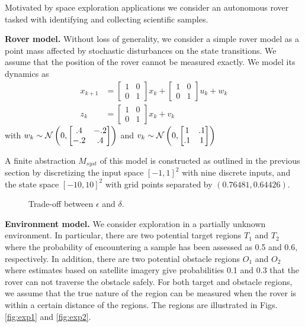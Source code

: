 
Motivated by space exploration applications we consider an autonomous rover tasked with identifying and collecting scientific samples.


\textbf{Rover model.} Without loss of generality, we consider a simple rover model as a point mass affected by stochastic disturbances on the state transitions. We assume that the position of the rover cannot be measured exactly. 
We model its dynamics as
\begin{align}
	x_{k+1}&=\begin{bmatrix}
		1&0\\
		0&1
	\end{bmatrix} x_{k} + \begin{bmatrix}
		1&0\\
		0&1
	\end{bmatrix} u_k+ w_k\\
z_k&=\begin{bmatrix}
		1&0\\
		0&1
	\end{bmatrix}x_k+v_k
\end{align}
with $w_k\sim \mathcal{N} \left(0,\begin{bmatrix}.4&-.2\\-.2&.4\end{bmatrix}\right)$ and $v_k\sim \mathcal{N} \left(0,\begin{bmatrix}1&.1\\.1&1\end{bmatrix}\right)$

A finite abstraction $M_{syst}$ of this model is constructed as outlined in the previous section by discretizing the input space $[-1,1]^2$ with nine discrete inputs, and the state space $[-10, 10]^2$ with grid points separated by $(0.76481, 0.64426)$.

\begin{figure}
	
	\caption{Trade-off between $\epsilon$ and $\delta$.  }
\end{figure}

\textbf{Environment model.} We consider exploration in a partially unknown environment. In particular, there are two potential target regions $T_1$ and $T_2$ where the probability of encountering a sample has been assessed as 0.5 and 0.6, respectively. In addition, there are two potential obstacle regions $O_1$ and $O_2$ where estimates based on satellite imagery give probabilities 0.1 and 0.3 that the rover can not traverse the obstacle safely. For both target and obstacle regions, we assume that the true nature of the region can be measured when the rover is within a certain distance of the regions. The regions are illustrated in Figs. \ref{fig:exp1} and \ref{fig:exp2}.

